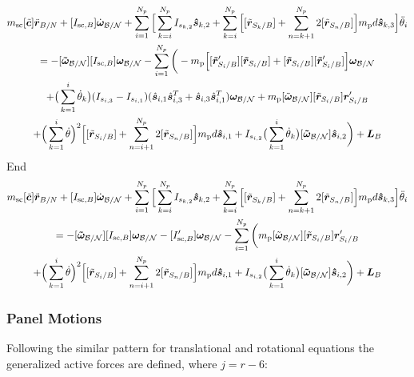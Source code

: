 \begin{multline}
	m_{\text{sc}}[\tilde{\bm{c}}]\ddot{\bm r}_{B/N} + [I_{\text{sc},B}] \dot{\bm\omega}_{\cal B/N} + \sum\limits_{i=1}^{N_p} \Big[\sum^{N_p}_{k=i}I_{s_{k,2}} \bm{\hat{s}}_{k,2} + \sum\limits_{k=i}^{N_p}\Big[ [\tilde{{\bm r}}_{S_{k}/B}] + \sum\limits_{n=k+1}^{N_p}2[\tilde{{\bm r}}_{S_{n}/B}]\Big]m_{\text{p}} d \bm{\hat{s}}_{k,3} \Big] \ddot{\theta}_i 
	\\
	= -[\bm{\tilde{\omega}}_{\cal B/N}] [I_{\text{sc},B}] \bm\omega_{\cal B/N} - \sum\limits_{i=1}^{N_p}\bigg( - m_{\text{p}}\Big[[\bm{\tilde{r}}'_{S_i/B}] [\bm{\tilde{r}}_{S_i/B}] + [\bm{\tilde{r}}_{S_i/B}] [\bm{\tilde{r}}'_{S_i/B}]\Big] \bm\omega_{\cal B/N} \\
	+\big(\sum^{i}_{k=1}\dot{\theta}_k\big)(I_{s_{i,3}}-I_{s_{i,1}})(\hat{\bm s}_{i,1}\hat{\bm s}_{i,3}^{T}+\hat{\bm s}_{i,3}\hat{\bm s}_{i,1}^{T}) \bm\omega_{\cal B/N} 
	+ m_{\text{p}} [\tilde{\bm\omega}_{\cal B/N}] [\tilde{{\bm r}}_{S_{i}/B}] \bm{r}'_{S_i/B} \\
	+ \Big( \sum\limits_{k=1}^{i} \dot{\theta}\Big)^2 \Big[[\tilde{{\bm r}}_{S_{i}/B}] 
	+ \sum\limits_{n=i+1}^{N_p}2[\tilde{{\bm r}}_{S_{n}/B}]\Big] m_{\text{p}} d \bm{\hat{s}}_{i,1}
	+ I_{s_{i,2}} \big(\sum^{i}_{k=1}\dot{\theta}_k\big) [\bm{\tilde{\omega}}_{\cal B/N}] \bm{\hat{s}}_{i,2} \bigg) + \bm L_B
\end{multline}
End
\begin{multline}
	m_{\text{sc}}[\tilde{\bm{c}}]\ddot{\bm r}_{B/N} + [I_{\text{sc},B}] \dot{\bm\omega}_{\cal B/N} + \sum\limits_{i=1}^{N_p} \Big[\sum^{N_p}_{k=i}I_{s_{k,2}} \bm{\hat{s}}_{k,2} + \sum\limits_{k=i}^{N_p}\Big[ [\tilde{{\bm r}}_{S_{k}/B}] + \sum\limits_{n=k+1}^{N_p}2[\tilde{{\bm r}}_{S_{n}/B}]\Big]m_{\text{p}} d \bm{\hat{s}}_{k,3} \Big] \ddot{\theta}_i
	\\
	= -[\bm{\tilde{\omega}}_{\cal B/N}] [I_{\text{sc},B}] \bm\omega_{\cal B/N} - [I'_{\text{sc},B}] \bm\omega_{\cal B/N} - \sum\limits_{i=1}^{N_p}\bigg( m_{\text{p}} [\tilde{\bm\omega}_{\cal B/N}] [\tilde{{\bm r}}_{S_{i}/B}] \bm{r}'_{S_i/B} \\
	+ \Big( \sum\limits_{k=1}^{i} \dot{\theta}\Big)^2 \Big[[\tilde{{\bm r}}_{S_{i}/B}] + \sum\limits_{n=i+1}^{N_p}2[\tilde{{\bm r}}_{S_{n}/B}]\Big] m_{\text{p}} d \bm{\hat{s}}_{i,1}
	+ I_{s_{i,2}} \big(\sum^{i}_{k=1}\dot{\theta}_k\big) [\bm{\tilde{\omega}}_{\cal B/N}] \bm{\hat{s}}_{i,2} \bigg) + \bm L_B
	\label{eq:rotmot}
\end{multline}

\subsubsection{Panel Motions}
Following the similar pattern for translational and rotational equations the generalized active forces are defined, where $j=r-6$:

